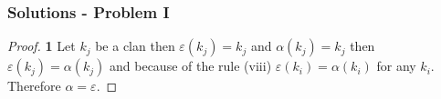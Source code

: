 \documentclass[11pt]{article}
\begin{document}
	\subsubsection*{Solutions - Problem I}
	\begin{proof}{\textbf{1}}
		Let $k_j$ be a clan then $\varepsilon(k_j)=k_j$ and 
		$\alpha(k_j)=k_j$ then $\varepsilon(k_j)=\alpha(k_j)$ and because of the rule (viii) $\varepsilon(k_i)=\alpha(k_i)$ for any $k_i$. Therefore $\alpha = \varepsilon$. 
	\end{proof}
\end{document}
